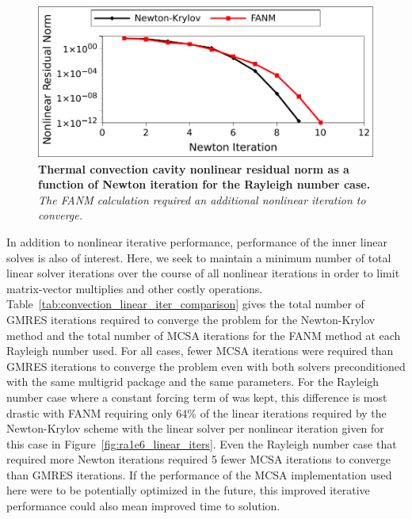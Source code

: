 \begin{figure}[t!]
  \begin{center}
    \includegraphics[width=6in]{chapters/nonlinear_problem/ra_1e5_convergence.pdf}
  \end{center}
  \caption{\textbf{Thermal convection cavity nonlinear residual norm
      as a function of Newton iteration for the  Rayleigh
      number case.} \textit{The FANM calculation required an
      additional nonlinear iteration to converge.}}
  \label{fig:ra1e5_convergence}
\end{figure}

In addition to nonlinear iterative performance, performance of the
inner linear solves is also of interest. Here, we seek to maintain a
minimum number of total linear solver iterations over the course of
all nonlinear iterations in order to limit matrix-vector multiplies
and other costly
operations. Table~\ref{tab:convection_linear_iter_comparison} gives
the total number of GMRES iterations required to converge the problem
for the Newton-Krylov method and the total number of MCSA iterations
for the FANM method at each Rayleigh number used. For all cases, fewer
MCSA iterations were required than GMRES iterations to converge the
problem even with both solvers preconditioned with the same multigrid
package and the same parameters. For the  Rayleigh number
case where a constant forcing term of  was kept, this
difference is most drastic with FANM requiring only 64\% of the linear
iterations required by the Newton-Krylov scheme with the linear solver
per nonlinear iteration given for this case in
Figure~\ref{fig:ra1e6_linear_iters}. Even the  Rayleigh
number case that required more Newton iterations required 5 fewer MCSA
iterations to converge than GMRES iterations. If the performance of
the MCSA implementation used here were to be potentially optimized in
the future, this improved iterative performance could also mean
improved time to solution.

